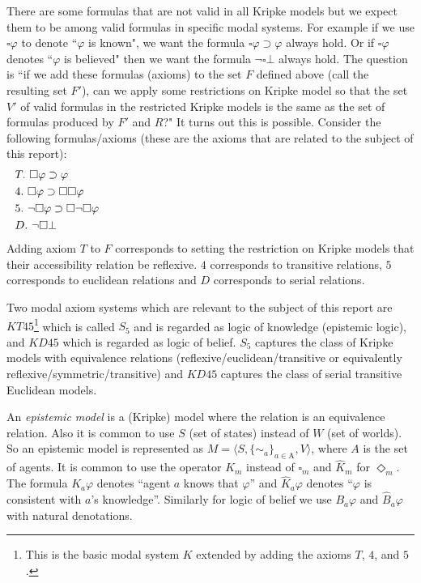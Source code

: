 \documentclass{article}
\begin{document}
There are some formulas that are not valid in all Kripke models but we expect them to be among valid formulas in specific modal systems. For example if we use $\square \varphi$ to denote ``$\varphi$ is known", we want the formula $\square \varphi\supset \varphi$ always hold. Or if $\square \varphi$ denotes ``$\varphi$ is believed" then we want the formula $\neg \square \bot$ always hold. The question is ``if we add these formulas (axioms) to the set $F$ defined above (call the resulting set $F'$), can we apply some restrictions on Kripke model so that the set $V'$ of valid formulas in the restricted Kripke models is the same as the set of formulas produced by $F'$ and $R$?" It turns out this is possible. Consider the following formulas/axioms (these are the axioms that are related to the subject of this report):
\begin{align*}
&T.\ \square \varphi\supset \varphi\hspace{10.5cm}\\
&4.\ \square \varphi\supset \square \square \varphi\\
&5.\ \neg \square \varphi\supset \square \neg \square \varphi\\
&D.\ \neg \square \bot
\end{align*}
Adding axiom $T$ to $F$ corresponds to setting the restriction on Kripke models that their accessibility relation be reflexive. $4$ corresponds to transitive relations, $5$ corresponds to euclidean relations and $D$ corresponds to serial relations. 

Two modal axiom systems which are relevant to the subject of this report are $KT45$\footnote{This is the basic modal system $K$ extended by adding the axioms $T$, $4$, and $5$.} which is called $S_5$ and is regarded as logic of knowledge (epistemic logic), and $KD45$ which is regarded as logic of belief. $S_5$ captures the class of Kripke models with equivalence relations (reflexive/euclidean/transitive or equivalently reflexive/symmetric/transitive) and $KD45$ captures the class of serial transitive Euclidean models. \cite{vanDitmarschEtAl07}

An \emph{epistemic model} is a (Kripke) model where the relation is an equivalence relation. Also it is common to use $S$ (set of states) instead of $W$ (set of worlds). So an epistemic model is represented as $M = \langle S, \{\sim_a\}_{a\in \text{A}}, V\rangle$, where $A$ is the set of agents. It is common to use the operator $K_m$ instead of $\square_m$ and $\hat{K}_m$ for $\Diamond_m$. The formula $K_a \varphi$ denotes ``agent $a$ knows that $\varphi$'' and $\hat{K}_a \varphi$ denotes ``$\varphi$ is consistent with $a$'s knowledge''. Similarly for logic of belief we use $B_a \varphi$ and $\hat{B}_a \varphi$ with natural denotations.\\
\end{document}
